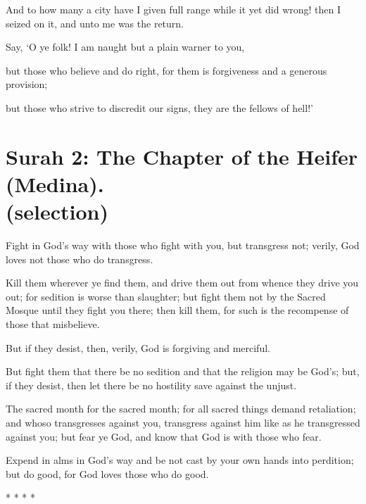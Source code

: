\documentclass[fontsize=14pt, letterpaper, notitlepage, openany, DIV=12]{scrbook} %
\begin{document}
\noindent[22:48]
And to how many a city have I given full range while it yet did wrong! then I seized on it,
and unto me was the return.

\noindent[22:49]
Say, `O ye folk! I am naught but a plain warner to you,

\noindent[22:50]
but those who believe and do right, for them is forgiveness and a generous provision;

\noindent[22:51]
but those who strive to discredit our signs, they are the fellows of hell!'


\section[Surah 2: The Chapter of the Heifer (Medina).]{Surah 2: The Chapter of the Heifer (Medina).\\ (selection)}


\noindent[2:190]
Fight in God's way with those who fight with you, but transgress not; verily, God loves
not those who do transgress.

\noindent[2:191]
Kill them wherever ye find them, and drive them out from whence they drive you out; for
sedition is worse than slaughter; but fight them not by the Sacred Mosque until they fight you
there; then kill them, for such is the recompense of those that misbelieve.

\noindent[2:192]
But if they desist, then, verily, God is forgiving and merciful.

\noindent[2:193]
But fight them that there be no sedition and that the religion may be God's; but, if they
desist, then let there be no hostility save against the unjust.

\noindent[2:194]
The sacred month for the sacred month; for all sacred things demand retaliation; and
whoso transgresses against you, transgress against him like as he transgressed against you; but
fear ye God, and know that God is with those who fear.

\noindent[2:195]
Expend in alms in God's way and be not cast by your own hands into perdition; but do
good, for God loves those who do good.

\begin{center}
  {\Huge
    *
    \hspace{2em}
    *
    \hspace{2em}
    *
    \hspace{2em}
    *
  }
\end{center}
\end{document}
